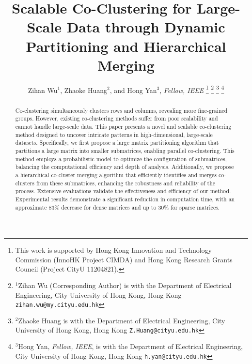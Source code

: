 \documentclass[letterpaper, 10 pt, conference]{ieeeconf}  %
\title{\LARGE \bf Scalable Co-Clustering for Large-Scale Data through Dynamic Partitioning and Hierarchical Merging}
\author{Zihan Wu$^{1}$, Zhaoke Huang$^{2}$, and Hong Yan$^{3}$, \textit{Fellow, IEEE}%
\thanks{This work is supported by Hong Kong Innovation and
Technology Commission (InnoHK Project CIMDA) and Hong
Kong Research Grants Council (Project CityU 11204821).}%
\thanks{$^{1}$Zihan Wu (Corresponding Author) is with the Department of Electrical Engineering,
        City University of Hong Kong, Hong Kong
        {\tt\small zihan.wu@my.cityu.edu.hk}}%
\thanks{$^{2}$Zhaoke Huang is with the Department of Electrical Engineering,
        City University of Hong Kong, Hong Kong
        {\tt\small Z.Huang@cityu.edu.hk}}%
\thanks{$^{3}$Hong Yan, \textit{Fellow, IEEE}, is with the Department of Electrical Engineering,
        City University of Hong Kong, Hong Kong
        {\tt\small h.yan@cityu.edu.hk}}%
}
\begin{document}
\maketitle

\thispagestyle{empty}
\pagestyle{empty}


\begin{abstract}
Co-clustering simultaneously clusters rows and columns, revealing more fine-grained groups. However, existing co-clustering methods suffer from poor scalability and cannot handle large-scale data. This paper presents a novel and scalable co-clustering method designed to uncover intricate patterns in high-dimensional, large-scale datasets. Specifically, we first propose a large matrix partitioning algorithm that partitions a large matrix into smaller submatrices, enabling parallel co-clustering. This method employs a probabilistic model to optimize the configuration of submatrices, balancing the computational efficiency and depth of analysis.
Additionally, we propose a hierarchical co-cluster merging algorithm that efficiently identifies and merges co-clusters from these submatrices, enhancing the robustness and reliability of the process. Extensive evaluations validate the effectiveness and efficiency of our method. Experimental results demonstrate a significant reduction in computation time, with an approximate 83\% decrease for dense matrices and up to 30\% for sparse matrices.

\end{abstract}
\end{document}
